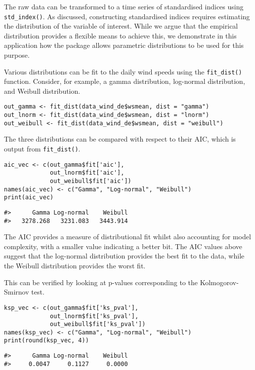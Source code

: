 The raw data can be transformed to a time series of standardised indices using \texttt{std\_index()}. As discussed, constructing standardised indices requires estimating the distribution of the variable of interest. While we argue that the empirical distribution provides a flexible means to achieve this, we demonstrate in this application how the  package allows parametric distributions to be used for this purpose.

Various distributions can be fit to the daily wind speeds using the \texttt{fit\_dist()} function. Consider, for example, a gamma distribution, log-normal distribution, and Weibull distribution.

\begin{verbatim}
out_gamma <- fit_dist(data_wind_de$wsmean, dist = "gamma")
out_lnorm <- fit_dist(data_wind_de$wsmean, dist = "lnorm")
out_weibull <- fit_dist(data_wind_de$wsmean, dist = "weibull")
\end{verbatim}

The three distributions can be compared with respect to their AIC, which is output from \texttt{fit\_dist()}.

\begin{verbatim}
aic_vec <- c(out_gamma$fit['aic'],
             out_lnorm$fit['aic'],
             out_weibull$fit['aic'])
names(aic_vec) <- c("Gamma", "Log-normal", "Weibull")
print(aic_vec)
\end{verbatim}

\begin{verbatim}
#>      Gamma Log-normal    Weibull 
#>   3278.268   3231.083   3443.914
\end{verbatim}

The AIC provides a measure of distributional fit whilst also accounting for model complexity, with a smaller value indicating a better bit. The AIC values above suggest that the log-normal distribution provides the best fit to the data, while the Weibull distribution provides the worst fit.

This can be verified by looking at p-values corresponding to the Kolmogorov-Smirnov test.

\begin{verbatim}
ksp_vec <- c(out_gamma$fit['ks_pval'],
             out_lnorm$fit['ks_pval'],
             out_weibull$fit['ks_pval'])
names(ksp_vec) <- c("Gamma", "Log-normal", "Weibull")
print(round(ksp_vec, 4))
\end{verbatim}

\begin{verbatim}
#>      Gamma Log-normal    Weibull 
#>     0.0047     0.1127     0.0000
\end{verbatim}

